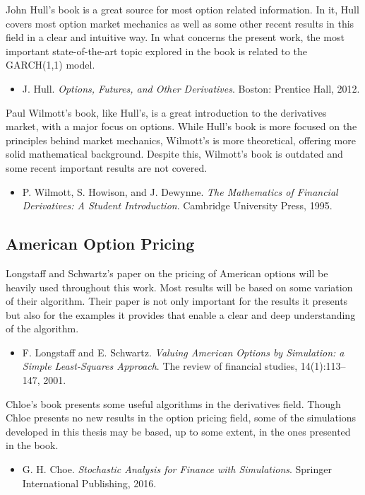 \documentclass[a4paper,twocolumn,aps,prd,longbibliography,superscriptaddress]{revtex4-1}
\begin{document}
John Hull's book is a great source for most option related information. In it, Hull covers most option market mechanics as well as some other recent results in this field in a clear and intuitive way.
In what concerns the present work, the most important state-of-the-art topic explored in the book is related to the GARCH(1,1) model.
\begin{itemize}
\item J. Hull. \textit{Options, Futures, and Other Derivatives}. Boston: Prentice Hall, 2012.
\end{itemize}

Paul Wilmott's book, like Hull's, is a great introduction to the derivatives market, with a major focus on options. While Hull's book is more focused on the principles behind market mechanics, Wilmott's is more theoretical, offering more solid mathematical background.
Despite this, Wilmott's book is outdated and some recent important results are not covered.
\begin{itemize}
\item P. Wilmott, S. Howison, and J. Dewynne. \textit{The Mathematics of Financial Derivatives: A Student Introduction}. Cambridge University Press, 1995.
\end{itemize}

\subsection{American Option Pricing}
Longstaff and Schwartz's paper on the pricing of American options will be heavily used throughout this work. Most results will be based on some variation of their algorithm. Their paper is not only important for the results it presents but also for the examples it provides that enable a clear and deep understanding of the algorithm.
\begin{itemize}
\item  F. Longstaff and E. Schwartz. \textit{Valuing American Options by Simulation: a Simple Least-Squares Approach}. The review of financial studies, 14(1):113–147, 2001.
\end{itemize}

Chloe's book presents some useful algorithms in the derivatives field. Though Chloe presents no new results in the option pricing field, some of the simulations developed in this thesis may be based, up to some extent, in the ones presented in the book.
\begin{itemize}
\item G. H. Choe. \textit{Stochastic Analysis for Finance with Simulations}. Springer International Publishing, 2016.
\end{itemize}
\end{document}
